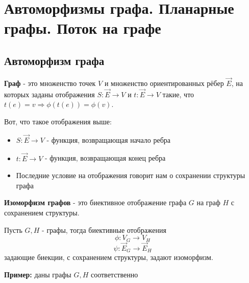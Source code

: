 \section{Автоморфизмы графа. Планарные графы. Поток на графе}
\subsection{Автоморфизм графа}
\begin{definition}
    \textbf{Граф} - это множенство точек $V$ и множенство ориентированных
     рёбер $\overrightarrow{E}$,
    на которых заданы отображения $S:\overrightarrow{E} \rightarrow V$ и $t:\overrightarrow{E} \rightarrow V$ такие,
    что $t(e)=v \Rightarrow \phi(t(e)) = \phi(v)$.
\end{definition}
\begin{explanation*}
    Вот, что такое отображения выше:
    \begin{itemize}
        \item $S:\overrightarrow{E} \rightarrow V$ - функция, возвращающая
        начало ребра
        \item$t:\overrightarrow{E} \rightarrow V$ - функция, возвращающая конец ребра
        \item Последние условие на отображения говорит нам о сохранении структуры графа
    \end{itemize}
\end{explanation*}

\begin{definition}
    \textbf{Изоморфизм графов} - это биективное отображение графа $G$ на граф $H$ с сохранением
    структуры.
\end{definition}
\begin{explanation*}
    Пусть $G, H$ - графы, тогда биективные отображения
        $$\phi : V_{G} \rightarrow V_{H}$$
        $$\psi : \overrightarrow{E}_{G} \rightarrow \overrightarrow{E}_{H}$$
задающие биекции, с сохранением структуры, задают изоморфизм.
\end{explanation*}
\textbf{Пример:} даны графы $G, H$ соответственно

